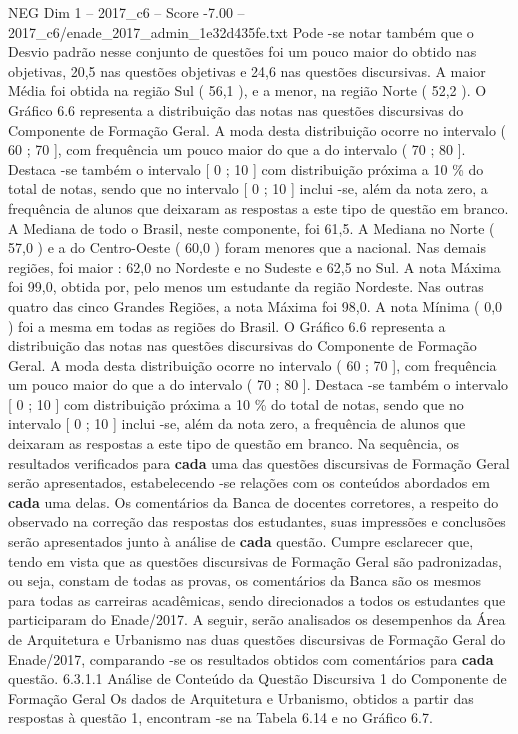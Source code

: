 \begin{textsample}{NEG Dim 1 – 2017\_c6 – Score -7.00 – 2017\_c6/enade\_2017\_admin\_1e32d435fe.txt}
Pode -se notar também que o Desvio padrão nesse conjunto de questões foi um pouco maior do obtido nas objetivas, 20,5 nas questões objetivas e 24,6 nas questões discursivas.
A maior Média foi obtida na região Sul ( 56,1 ), e a menor, na região Norte ( 52,2 ).
O Gráfico 6.6 representa a distribuição das notas nas questões discursivas do Componente de Formação Geral.
A moda desta distribuição ocorre no intervalo ( 60 ; 70 ], com frequência um pouco maior do que a do intervalo ( 70 ; 80 ].
Destaca -se também o intervalo [ 0 ; 10 ] com distribuição próxima a 10 \% do total de notas, sendo que no intervalo [ 0 ; 10 ] inclui -se, além da nota zero, a frequência de alunos que deixaram as respostas a este tipo de questão em branco.
A Mediana de todo o Brasil, neste componente, foi 61,5.
A Mediana no Norte ( 57,0 ) e a do Centro-Oeste ( 60,0 ) foram menores que a nacional.
Nas demais regiões, foi maior : 62,0 no Nordeste e no Sudeste e 62,5 no Sul.
A nota Máxima foi 99,0, obtida por, pelo menos um estudante da região Nordeste.
Nas outras quatro das cinco Grandes Regiões, a nota Máxima foi 98,0.
A nota Mínima ( 0,0 ) foi a mesma em todas as regiões do Brasil.
O Gráfico 6.6 representa a distribuição das notas nas questões discursivas do Componente de Formação Geral.
A moda desta distribuição ocorre no intervalo ( 60 ; 70 ], com frequência um pouco maior do que a do intervalo ( 70 ; 80 ].
Destaca -se também o intervalo [ 0 ; 10 ] com distribuição próxima a 10 \% do total de notas, sendo que no intervalo [ 0 ; 10 ] inclui -se, além da nota zero, a frequência de alunos que deixaram as respostas a este tipo de questão em branco.
Na sequência, os resultados verificados para \textbf{cada} uma das questões discursivas de Formação Geral serão apresentados, estabelecendo -se relações com os conteúdos abordados em \textbf{cada} uma delas.
Os comentários da Banca de docentes corretores, a respeito do observado na correção das respostas dos estudantes, suas impressões e conclusões serão apresentados junto à análise de \textbf{cada} questão.
Cumpre esclarecer que, tendo em vista que as questões discursivas de Formação Geral são padronizadas, ou seja, constam de todas as provas, os comentários da Banca são os mesmos para todas as carreiras acadêmicas, sendo direcionados a todos os estudantes que participaram do Enade/2017.
A seguir, serão analisados os desempenhos da Área de Arquitetura e Urbanismo nas duas questões discursivas de Formação Geral do Enade/2017, comparando -se os resultados obtidos com comentários para \textbf{cada} questão. 6.3.1.1 Análise de Conteúdo da Questão Discursiva 1 do Componente de Formação Geral Os dados de Arquitetura e Urbanismo, obtidos a partir das respostas à questão 1, encontram -se na Tabela 6.14 e no Gráfico 6.7.

\end{textsample}
